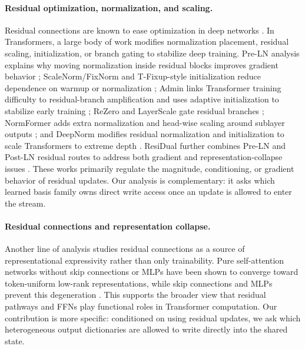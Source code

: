 \documentclass[letterpaper]{article}
\begin{document}
\paragraph{Residual optimization, normalization, and scaling.}
Residual connections are known to ease optimization in deep networks
\citep{he2016identity}. In Transformers, a large body of work modifies
normalization placement, residual scaling, initialization, or branch gating to
stabilize deep training. Pre-LN analysis explains why moving normalization
inside residual blocks improves gradient behavior \citep{xiong2020layer};
ScaleNorm/FixNorm and T-Fixup-style initialization reduce dependence on warmup
or normalization \citep{nguyen2019transformers,huang2020improving}; Admin
links Transformer training difficulty to residual-branch amplification and
uses adaptive initialization to stabilize early training
\citep{liu2020understanding}; ReZero and LayerScale gate residual branches
\citep{bachlechner2021rezero,touvron2021going};
NormFormer adds extra normalization and head-wise scaling around sublayer
outputs \citep{shleifer2021normformer}; and DeepNorm modifies residual
normalization and initialization to scale Transformers to extreme depth
\citep{wang2022deepnet}. ResiDual further combines Pre-LN and Post-LN residual
routes to address both gradient and representation-collapse issues
\citep{xie2023residual}. These works primarily regulate the magnitude,
conditioning, or gradient behavior of residual updates. Our analysis is
complementary: it asks which learned basis family owns direct write access once
an update is allowed to enter the stream.

\paragraph{Residual connections and representation collapse.}
Another line of analysis studies residual connections as a source of
representational expressivity rather than only trainability. Pure self-attention
networks without skip connections or MLPs have been shown to converge toward
token-uniform low-rank representations, while skip connections and MLPs prevent
this degeneration \citep{dong2021attention}. This supports the broader view
that residual pathways and FFNs play functional roles in Transformer
computation. Our contribution is more specific: conditioned on using residual
updates, we ask which heterogeneous output dictionaries are allowed to write
directly into the shared state.
\end{document}
